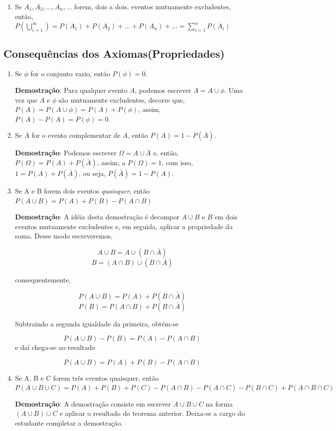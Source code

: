 \documentclass[a4paper,12pt]{report}
\begin{document}
{\begin{enumerate}
     \item Se $A_{1},A_{2},...,A_{n},...$ forem, dois a dois,
     eventos mutuamente excludentes, então,
     $P(\bigcup_{i=1}^{\infty})=P(A_{1})+P(A_{2})+...+P(A_{n})+...
     = \sum_{i=1}^{n}P(A_{i})$
\end{enumerate}

\subsection{Consequências dos Axiomas(Propriedades)}

\begin{enumerate}
    \item Se $\phi$ for o conjunto vazio, então
    $P(\phi)=0$.

\textbf{Demostração}: Para qualquer evento $A$, podemos escrever
$A=A\cup \phi$. Uma vez que $A$ e $\phi$ são mutuamente
excludentes, decorre que, $P(A)=P(A\cup \phi)= P(A)+P(\phi)$,
assim, $P(A)- P(A)= P(\phi)= 0$.
    \item Se $\bar{A}$ for o evento complementar de $A$, então
    $P(A)=1-P(\bar{A})$.

\textbf{Demostração}: Podemos escrever $\Omega = A \cup \bar{A}$
e, então, $P(\Omega)= P(A)+ P(\bar{A})$, assim, a $P(\Omega)=1$,
com isso, $1= P(A)+P(\bar{A})$, ou seja, $P(\bar{A})= 1- P(A)$.
    \item Se A e B forem dois eventos \emph{quaisquer}, então $P(A\cup B)=P(A)+P(B)-P(A\cap B)$

\textbf{Demostração}: A idéia desta demostração é decompor $A\cup
B$ e $B$ em dois eventos mutuamente excludentes e, em seguida,
aplicar a propriedade da soma. Desse modo escreveremos,

$$A \cup B= A\cup (B\cap \bar{A})$$
$$B= (A \cap B) \cup (B\cap \bar{A})$$

consequentemente,

$$P(A \cup B)= P(A)+P(B \cap \bar{A})$$
$$ P(B) = P(A \cap B) + P(B \cap \bar{A})$$

Subtraindo a segunda igualdade da primeira, obtém-se

$$ P(A \cup B) - P(B) = P(A)- P(A \cap B)$$
 e daí chega-se ao resultado

$$ P(A \cup B) = P(A)+P(B)- P(A \cap B)$$
    \item Se A, B e C forem três eventos quaisquer, então $P(A \cup B \cup C) = P(A)+P(B)+P(C)-P(A\cap B)-P(A\cap C)-P(B\cap C)+P(A\cap B \cap C)$


\textbf{ \maltese Demostração}: A demostração consiste em escrever
$A \cup B \cup C$ na forma $(A \cup B)\cup C$ e aplicar o
resultado do teorema anterior. Deixa-se a cargo do estudante
completar a demostração.


\end{enumerate}}
\end{document}

